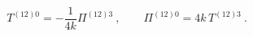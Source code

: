 \begin{equation}
T^{\left( 12\right) 0}=-\frac{1}{4k}\Pi ^{\left( 12\right) 3}\ ,\qquad \Pi
^{(12)0}=4k\,T^{(12)3}\ .
\end{equation}%
